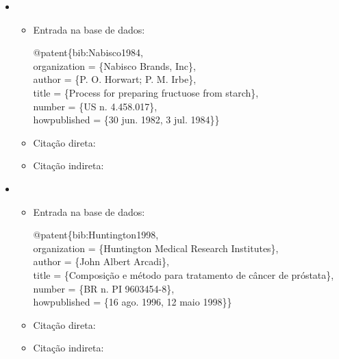 \documentclass[a4paper,12pt,oneside,onecolumn]{uerj}
\newcommand{\formato}[1]{\begin{flushleft}{#1}\end{flushleft}}
\begin{document}
\begin{itemize}[label={Ex.:},leftmargin=\parindent,parsep=0pt,itemsep=0pt]
  \item \formato{\citetext{bib:Nabisco1984}}

  \begin{itemize}[leftmargin=*,parsep=0pt,itemsep=0pt]
    \item Entrada na base de dados:

    \formato{
      @patent\{bib:Nabisco1984,\\
      organization = \{Nabisco Brands, Inc\},\\
      author = \{P. O. Horwart; P. M. Irbe\},\\
      title = \{Process for preparing fructuose from starch\},\\
      number = \{US n. 4.458.017\},\\
      howpublished = \{30 jun. 1982, 3 jul. 1984\}\}\\
    }

    \item Citação direta: 
    \item Citação indireta: \cite{bib:Nabisco1984}\\
  \end{itemize}

  \item \formato{\citetext{bib:Huntington1998}}

  \begin{itemize}[leftmargin=*,parsep=0pt,itemsep=0pt]
    \item Entrada na base de dados:

    \formato{
      @patent\{bib:Huntington1998,\\
      organization = \{Huntington Medical Research Institutes\},\\
      author = \{John Albert Arcadi\},\\
      title = \{Composi{\c c}{\~a}o e m{\'e}todo para tratamento de 
               c{\^a}ncer de pr{\'o}stata\},\\
      number = \{BR n. PI 9603454-8\},\\
      howpublished = \{16 ago. 1996, 12 maio 1998\}\}\\
    }

    \item Citação direta: 
    \item Citação indireta: \cite{bib:Huntington1998}
  \end{itemize}
\end{itemize}
\end{document}
